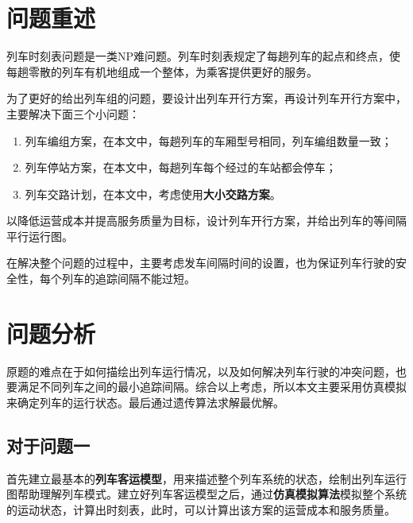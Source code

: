 \setcounter{page}{1}        %

%
%

\section{问题重述}



列车时刻表问题是一类NP难问题\cite{caoJiyuchengkedengdaishijiandechengshiguidaojiaotongliecheshikebiaoyouhuamoxingyusuanfayanjiu2021}。列车时刻表规定了每趟列车的起点和终点，使每趟零散的列车有机地组成一个整体，为乘客提供更好的服务。

为了更好的给出列车组的问题，要设计出列车开行方案，再设计列车开行方案中，主要解决下面三个小问题：

\begin{enumerate}
    \item 列车编组方案，在本文中，每趟列车的车厢型号相同，列车编组数量一致；
    \item 列车停站方案，在本文中，每趟列车每个经过的车站都会停车；
    \item 列车交路计划，在本文中，考虑使用\textbf{大小交路方案}。
\end{enumerate}

以降低运营成本并提高服务质量为目标，设计列车开行方案，并给出列车的等间隔平行运行图。

在解决整个问题的过程中，主要考虑发车间隔时间的设置，也为保证列车行驶的安全性，每个列车的追踪间隔不能过短。

%
%

\section{问题分析}

原题的难点在于如何描绘出列车运行情况，以及如何解决列车行驶的冲突问题，也要满足不同列车之间的最小追踪间隔。综合以上考虑，所以本文主要采用仿真模拟来确定列车的运行状态。最后通过遗传算法求解最优解。

\subsection{对于问题一}

首先建立最基本的\textbf{列车客运模型}，用来描述整个列车系统的状态，绘制出列车运行图帮助理解列车模式。建立好列车客运模型之后，通过\textbf{仿真模拟算法}模拟整个系统的运动状态，计算出时刻表，此时，可以计算出该方案的运营成本和服务质量。

